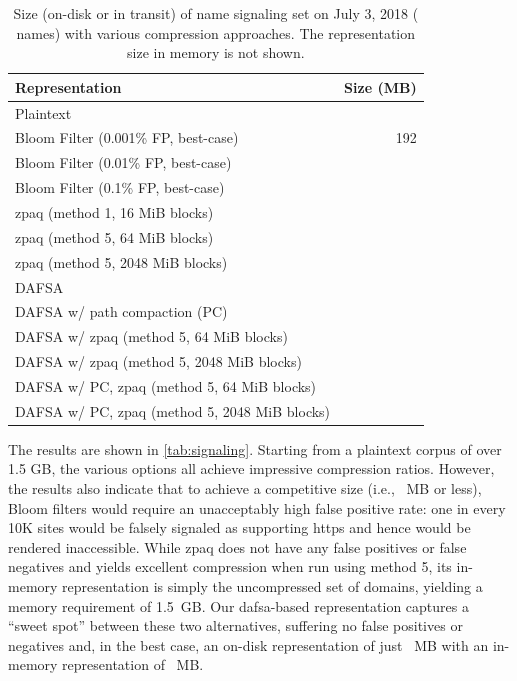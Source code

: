 \begin{table}[tbp]
  \small
  \centering
  \caption{Size (on-disk or in transit) of \ac{name} signaling set on
    July 3, 2018 (\numnames{} names) with various compression approaches. The
    representation size in memory is not shown.}
  \begin{tabular}{|lr|}
    \toprule
    \textbf{Representation} & \textbf{Size (MB)} \\
    \midrule
    Plaintext & \plaintextsize \\
    \midrule
    Bloom Filter (0.001\% FP, best-case) & 192 \\
    Bloom Filter (0.01\% FP, best-case) & \bloomlargesize \\
    Bloom Filter (0.1\% FP, best-case) & \bloommedsize \\
    \midrule
    zpaq (method 1, 16 MiB blocks) & \zpaqlargesize \\
    zpaq (method 5, 64 MiB blocks) & \zpaqmedsize \\
    zpaq (method 5, 2048 MiB blocks) & \zpaqsmallsize \\
    \midrule
    DAFSA & \fsalargesize \\
    DAFSA w/ path compaction (PC) & \fsamedsize \\
    DAFSA w/ zpaq (method 5, 64 MiB blocks) & \fsazpaqlargesize \\
    DAFSA w/ zpaq (method 5, 2048 MiB blocks) & \fsazpaqmedsize \\
    DAFSA w/ PC, zpaq (method 5, 64 MiB blocks) & \fsapczpaqlargesize \\
    DAFSA w/ PC, zpaq (method 5, 2048 MiB blocks) & \fsapczpaqmedsize \\
    \bottomrule
  \end{tabular}
  \label{tab:signaling}
\end{table}

The results are shown in \autoref{tab:signaling}. Starting from a plaintext
corpus of over 1.5 GB, the various options all achieve impressive compression
ratios. However, the results also indicate that to achieve a competitive size
(i.e., \bloomlargesize{}~MB or less), Bloom filters would require an
unacceptably high false positive rate: one in every 10K sites would be falsely
signaled as supporting \ac{https} and hence would be rendered inaccessible.
While zpaq does not have any false positives or false negatives and yields
excellent compression when run using method 5, its in-memory representation is
simply the uncompressed set of domains, yielding a memory requirement of 1.5~GB.
Our \ac{dafsa}-based representation captures a ``sweet spot'' between these two
alternatives, suffering no false positives or negatives and, in the best case,
an on-disk representation of just \fsapczpaqmedsize{}~MB with an in-memory
representation of \fsamedsize{}~MB.

